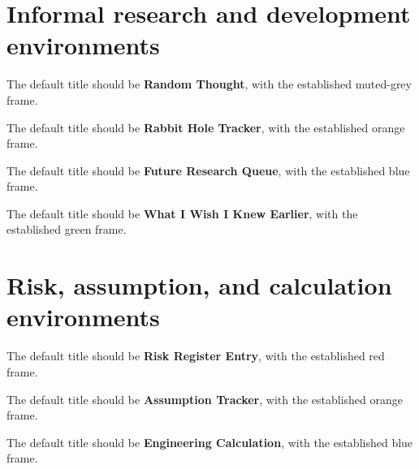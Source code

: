 \documentclass{otengineering}
\begin{document}
\section{Informal research and development environments}

\begin{thought}
    The default title should be \textbf{Random Thought}, with the
    established muted-grey frame.
\end{thought}

\begin{rabbithole}
    The default title should be \textbf{Rabbit Hole Tracker}, with the
    established orange frame.
\end{rabbithole}

\begin{researchqueue}
    The default title should be \textbf{Future Research Queue}, with the
    established blue frame.
\end{researchqueue}

\begin{wisdom}
    The default title should be \textbf{What I Wish I Knew Earlier}, with
    the established green frame.
\end{wisdom}

\section{Risk, assumption, and calculation environments}

\begin{risk}
    The default title should be \textbf{Risk Register Entry}, with the
    established red frame.
\end{risk}

\begin{assumption}
    The default title should be \textbf{Assumption Tracker}, with the
    established orange frame.
\end{assumption}

\begin{calculation}
    The default title should be \textbf{Engineering Calculation}, with the
    established blue frame.

\end{calculation}
\end{document}
